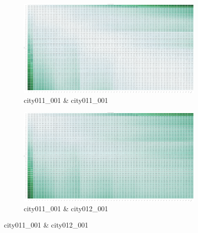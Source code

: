 \documentclass[a4paper,12pt]{article}
\begin{document}
\begin{figure}[h]
    \centering
    \begin{subfigure}[b]{0.45\textwidth}
      \centering
      \includegraphics[width=\textwidth,bb=0.000000 0.000000 1329.122658 697.681395]{./equal.png}
      \caption{city011\_001 \& city011\_001}
      \label{fig:equal}
    \end{subfigure}
    \hfill
    \begin{subfigure}[b]{0.45\textwidth}
      \centering
      \includegraphics[width=\textwidth,bb=0.000000 0.000000 1329.122658 697.681395]{./same.png}
      \caption{city011\_001 \& city012\_001}
      \label{fig:same}
    \end{subfigure}
  
    \vspace{0.5cm} %
  

\end{figure}
\end{document}
